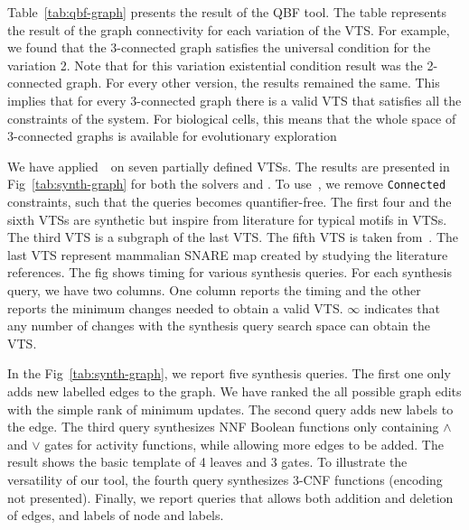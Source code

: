 

Table~\ref{tab:qbf-graph} presents the result of the QBF tool.
%
The table represents the result of the graph connectivity for each variation of the VTS.  
%
For example, we found that the 3-connected graph satisfies the universal condition for the variation 2. 
%
Note that for this variation existential condition result was the 2-connected graph. 
%
For every other version, the results remained the same.
%
This implies that for every 3-connected graph there is a valid VTS that satisfies all the constraints of the system.
% 
For biological cells, this means that the whole space of 3-connected graphs is available for evolutionary exploration
%



We have applied~\ourtool~on seven partially defined VTSs.
%
The results are presented in Fig~\ref{tab:synth-graph} for both the solvers
\depqbf and \zthree.
%
To use~\zthree, we remove \texttt{Connected} constraints, such that the queries becomes
quantifier-free.
%
%
%
The first four and the sixth VTSs are synthetic but inspire from literature for
typical motifs in VTSs. 
%
The third VTS is a subgraph of the last VTS.
%
%
The fifth VTS is taken from~\cite{burri2004complete}.
%
The last VTS represent mammalian SNARE map created by studying the literature references.  
%
The fig shows timing for various synthesis queries.
%
For each synthesis query, we have two columns.
%
One column reports the timing and the other reports the minimum changes needed to obtain a valid VTS.
%
$\infty$ indicates that any number of changes with the synthesis query
search space can obtain the VTS.
%

In the Fig~\ref{tab:synth-graph}, we report five synthesis queries.
%
The first one only adds new labelled edges to the graph.
%
We have ranked the all possible graph edits with the simple rank of
minimum updates.
%
The second query adds new labels to the edge.
%
The third query synthesizes NNF Boolean functions only containing
$\land$ and $\lor$ gates for activity functions, while allowing
more edges to be added.
%
The result shows the basic template of 4 leaves and 3 gates.
%
%
To illustrate the versatility of our tool, the fourth query
synthesizes $3$-CNF functions (encoding not presented).
%
Finally, we report queries that allows both addition and deletion of edges, and labels
of node and labels. 

